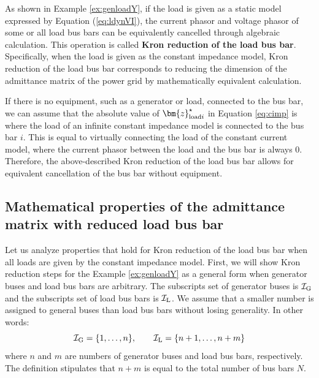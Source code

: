 \documentclass[graybox, envcountchap]{svmult}
\begin{document}
As shown in Example \ref{ex:genloadY}, if the load is given as a static model expressed by Equation (\ref{eq:ldynVI}), the current phasor and voltage phasor of some or all load bus bars can be equivalently cancelled through algebraic calculation.
This operation is called \textbf{Kron reduction of the load bus bar}.
Specifically, when the load is given as the constant impedance model, Kron reduction of the load bus bar corresponds to reducing the dimension of the admittance matrix of the power grid by mathematically equivalent calculation.

If there is no equipment, such as a generator or load, connected to the bus bar, we can assume that the absolute value of $\bm{z}_{{\rm load}i}^{\star}$ in Equation \ref{eq:cimp} is where the load of an infinite constant impedance model is connected to the bus bar $i$.
This is equal to virtually connecting the load of the constant current model, where the current phasor between the load and the bus bar is always 0.
Therefore, the above-described Kron reduction of the load bus bar allows for equivalent cancellation of the bus bar without equipment.


\subsection{Mathematical properties of the admittance matrix with reduced load bus bar}

Let us analyze properties that hold for Kron reduction of the load bus bar when all loads are given by the constant impedance model.
First, we will show Kron reduction steps for the Example \ref{ex:genloadY} as a general form when generator buses and load bus bars are arbitrary.
The subscripts set of generator buses is $\mathcal{I}_{\rm G}$ and the subscripts set of load bus bars is $\mathcal{I}_{\rm L}$.
We assume that a smaller number is assigned to general buses than load bus bars without losing generality. In other words:
\begin{equation*}
\mathcal{I}_{\rm G} = \{ 1,\ldots, n \},\qquad
\mathcal{I}_{\rm L} = \{ n+1,\ldots, n + m \}
\end{equation*}
where $n$ and $m$ are numbers of generator buses and load bus bars, respectively.
The definition stipulates that $n+m$ is equal to the total number of bus bars $N$.
\end{document}
